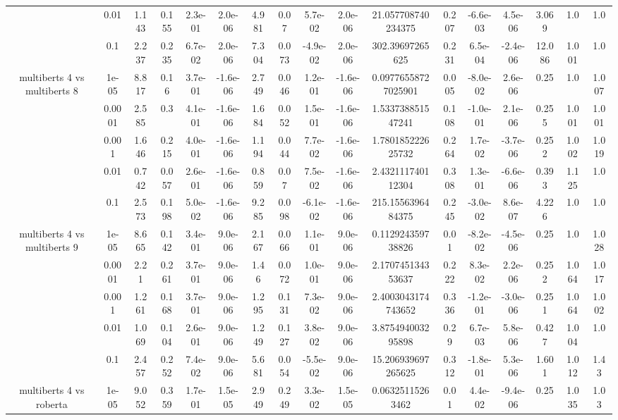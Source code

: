 \begin{tabular}{|c|c|c|c|c|c|c|c|c|c|c|c|c|c|c|c|c|}
 & 0.01 & 1.143 & 0.155 & 2.3e-01 & 2.0e-06 & 4.981 & 0.07 & 5.7e-02 & 2.0e-06 & 21.057708740234375 & 0.207 & -6.6e-03 & 4.5e-06 & 3.069 & 1.0 & 1.0 \\
 & 0.1 & 2.237 & 0.235 & 6.7e-02 & 2.0e-06 & 7.304 & 0.073 & -4.9e-02 & 2.0e-06 & 302.39697265625 & 0.231 & 6.5e-04 & -2.4e-06 & 12.086 & 1.001 & 1.0 \\
\hline
\multirow{5}{*}{multiberts 4 vs multiberts 8} & 1e-05 & 8.817 & 0.16 & 3.7e-01 & -1.6e-06 & 2.749 & 0.046 & 1.2e-01 & -1.6e-06 & 0.09776558727025901 & 0.005 & -8.0e-02 & 2.6e-06 & 0.25 & 1.0 & 1.007 \\
 & 0.0001 & 2.585 & 0.3 & 4.1e-01 & -1.6e-06 & 1.684 & 0.052 & 1.5e-01 & -1.6e-06 & 1.533738851547241 & 0.108 & -1.0e-01 & 2.1e-06 & 0.255 & 1.001 & 1.001 \\
 & 0.001 & 1.646 & 0.215 & 4.0e-01 & -1.6e-06 & 1.194 & 0.044 & 7.7e-02 & -1.6e-06 & 1.780185222625732 & 0.264 & 1.7e-02 & -3.7e-06 & 0.252 & 1.002 & 1.019 \\
 & 0.01 & 0.742 & 0.057 & 2.6e-01 & -1.6e-06 & 0.859 & 0.07 & 7.5e-02 & -1.6e-06 & 2.432111740112304 & 0.308 & 1.3e-01 & -6.6e-06 & 0.393 & 1.125 & 1.0 \\
 & 0.1 & 2.573 & 0.198 & 5.0e-02 & -1.6e-06 & 9.285 & 0.098 & -6.1e-02 & -1.6e-06 & 215.1556396484375 & 0.245 & -3.0e-02 & 8.6e-07 & 4.226 & 1.0 & 1.0 \\
\hline
\multirow{5}{*}{multiberts 4 vs multiberts 9} & 1e-05 & 8.665 & 0.142 & 3.4e-01 & 9.0e-06 & 2.167 & 0.066 & 1.1e-01 & 9.0e-06 & 0.112924359738826 & 0.01 & -8.2e-02 & -4.5e-06 & 0.25 & 1.0 & 1.028 \\
 & 0.0001 & 2.21 & 0.261 & 3.7e-01 & 9.0e-06 & 1.46 & 0.072 & 1.0e-01 & 9.0e-06 & 2.170745134353637 & 0.222 & 8.3e-02 & 2.2e-06 & 0.252 & 1.064 & 1.017 \\
 & 0.001 & 1.261 & 0.168 & 3.7e-01 & 9.0e-06 & 1.295 & 0.131 & 7.3e-02 & 9.0e-06 & 2.4003043174743652 & 0.336 & -1.2e-01 & -3.0e-06 & 0.251 & 1.064 & 1.002 \\
 & 0.01 & 1.069 & 0.104 & 2.6e-01 & 9.0e-06 & 1.249 & 0.127 & 3.8e-02 & 9.0e-06 & 3.875494003295898 & 0.29 & 6.7e-03 & 5.8e-06 & 0.427 & 1.004 & 1.0 \\
 & 0.1 & 2.457 & 0.252 & 7.4e-02 & 9.0e-06 & 5.681 & 0.054 & -5.5e-02 & 9.0e-06 & 15.206939697265625 & 0.312 & -1.8e-01 & 5.3e-06 & 1.601 & 1.012 & 1.43 \\
\hline
\multirow{5}{*}{multiberts 4 vs roberta } & 1e-05 & 9.052 & 0.359 & 1.7e-01 & 1.5e-05 & 2.949 & 0.249 & 3.3e-02 & 1.5e-05 & 0.06325115263462 & 0.01 & 4.4e-02 & -9.4e-06 & 0.25 & 1.035 & 1.03 \\

\end{tabular}
